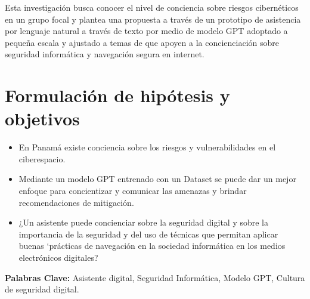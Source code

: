 Esta investigación busca conocer el nivel de conciencia sobre riesgos cibernéticos en un grupo focal y plantea una propuesta a través de un prototipo de asistencia por lenguaje natural a través de texto por medio de modelo GPT adoptado a pequeña escala y ajustado a temas de que apoyen a la concienciación sobre seguridad informática y navegación segura en internet.\\
 
\section{Formulación de hipótesis y objetivos} \label{section:thesis organization} %

    \begin{itemize}
        \item En Panamá existe conciencia sobre los riesgos y vulnerabilidades en el ciberespacio.
        \item Mediante un modelo GPT entrenado con un Dataset se puede dar un mejor enfoque para concientizar y comunicar las amenazas y brindar recomendaciones de mitigación.
        \item ¿Un asistente puede concienciar sobre la seguridad digital y sobre la importancia de la seguridad y del uso de técnicas que permitan aplicar buenas ‘prácticas de navegación en la sociedad informática en los medios electrónicos digitales?

    \end{itemize}

 {\normalsize \bf Palabras Clave: }
    {\normalsize Asistente digital, Seguridad Informática, Modelo GPT, Cultura de seguridad digital.}


